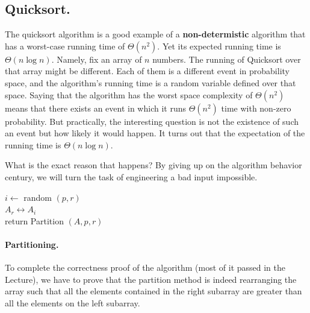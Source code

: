 
\subsection*{Quicksort.}
The quicksort algorithm is a good example of a \textbf{non-determistic} algorithm that has a worst-case running time of $\Theta\left(n^{2}\right)$. Yet its expected running time is $\Theta\left(n\log n\right)$. Namely, fix an array of $n$ numbers. The running of Quicksort over that array might be different. Each of them is a different event in probability space, and the algorithm's running time is a random variable defined over that space. Saying that the algorithm has the worst space complexity of $\Theta(n^{2})$ means that there exists an event in which it runs $\Theta\left(n^{2}\right)$ time with non-zero probability. But practically, the interesting question is not the existence of such an event but how likely it would happen. It turns out that the expectation of the running time is $\Theta\left(n\log n\right)$.  

What is the exact reason that happens? By giving up on the algorithm behavior century, we will turn the task of engineering a bad input impossible.    
 

  \begin{algorithm}[H]
      $i \leftarrow $ random $(p, r)$ \\
      $A_{r} \leftrightarrow A_{i} $ \\
      return Partition $(A, p, r)$
    \end{algorithm}

 
      \begin{algorithm}[H]
      \end{algorithm}



\paragraph{Partitioning.}
To complete the correctness proof of the algorithm (most of it passed in the Lecture), we have to prove that the partition method is indeed rearranging the array such that all the elements contained in the right subarray are greater than all the elements on the left subarray.  

